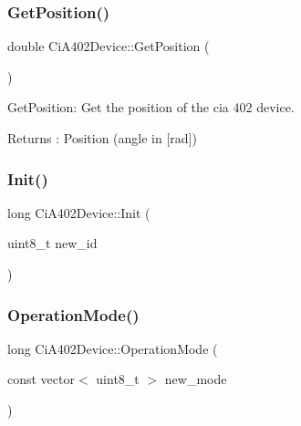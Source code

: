 \mbox{\label{classCiA402Device_ac8d9e36e6f457565cac7d26d91e4a712}} 
\subsubsection{\texorpdfstring{Get\+Position()}{GetPosition()}}
{\footnotesize\ttfamily double Ci\+A402\+Device\+::\+Get\+Position (\begin{DoxyParamCaption}{ }\end{DoxyParamCaption})}



Get\+Position\+: Get the position of the cia 402 device. 

\begin{DoxyReturn}{Returns}
\+: Position (angle in \mbox{[}rad\mbox{]}) 
\end{DoxyReturn}
\mbox{\label{classCiA402Device_a622a8884e21d9c4b5ffa0d6c1458ef08}} 
\subsubsection{\texorpdfstring{Init()}{Init()}}
{\footnotesize\ttfamily long Ci\+A402\+Device\+::\+Init (\begin{DoxyParamCaption}\item[{uint8\+\_\+t}]{new\+\_\+id }\end{DoxyParamCaption})\hspace{0.3cm}{\ttfamily [private]}}

\mbox{\label{classCiA402Device_a49f298cf0d4d2d68007b3cb396e93a17}} 
\subsubsection{\texorpdfstring{Operation\+Mode()}{OperationMode()}}
{\footnotesize\ttfamily long Ci\+A402\+Device\+::\+Operation\+Mode (\begin{DoxyParamCaption}\item[{const vector$<$ uint8\+\_\+t $>$}]{new\+\_\+mode }\end{DoxyParamCaption})}


